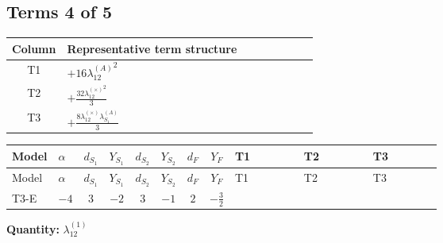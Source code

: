 \documentclass[8pt]{article}
\begin{document}
\begin{landscape}
\subsection*{Terms 4 of 5}
\begin{center}
\begin{tabular}{@{}c >{\raggedright\arraybackslash}p{0.82\linewidth}@{}}
\toprule
Column & Representative term structure \\
\midrule
T1 & \(\displaystyle +16 {\lambda_{12}^{(A)}}^2\) \\
\midrule
T2 & \(\displaystyle +\frac{32 {\lambda_{12}^{(\times)}}^2}{3}\) \\
\midrule
T3 & \(\displaystyle +\frac{8 {\lambda_{12}^{(\times)}} {\lambda_{S_1}^{(A)}}}{3}\) \\
\midrule
\bottomrule
\end{tabular}
\end{center}
\smallskip
\tiny
\begin{longtable}{@{}llcccccc >{\raggedright\arraybackslash}p{0.21\linewidth} >{\raggedright\arraybackslash}p{0.21\linewidth} >{\raggedright\arraybackslash}p{0.21\linewidth}@{}}
\toprule
Model & $\alpha$ & $d_{S_1}$ & $Y_{S_1}$ & $d_{S_2}$ & $Y_{S_2}$ & $d_F$ & $Y_F$ & T1 & T2 & T3 \\
\midrule
\endfirsthead
\toprule
Model & $\alpha$ & $d_{S_1}$ & $Y_{S_1}$ & $d_{S_2}$ & $Y_{S_2}$ & $d_F$ & $Y_F$ & T1 & T2 & T3 \\
\midrule
\endhead
T3-E & $-4$ & $3$ & $-2$ & $3$ & $-1$ & $2$ & $-\frac{3}{2}$ & \scriptsize\adjustbox{max width=\linewidth}{$\begin{gathered} +16 {\lambda_{12}^{(A)}}^2\end{gathered}$} & \scriptsize\adjustbox{max width=\linewidth}{$\begin{gathered} +\frac{32 {\lambda_{12}^{(\times)}}^2}{3}\end{gathered}$} & \scriptsize\adjustbox{max width=\linewidth}{$\begin{gathered} +\frac{8 {\lambda_{12}^{(\times)}} {\lambda_{S_1}^{(A)}}}{3}\end{gathered}$} \\
\midrule
\bottomrule
\end{longtable}
\clearpage
\noindent\textbf{Quantity: }$\lambda_{12}^{(1)}$\par\smallskip

\end{landscape}
\end{document}
